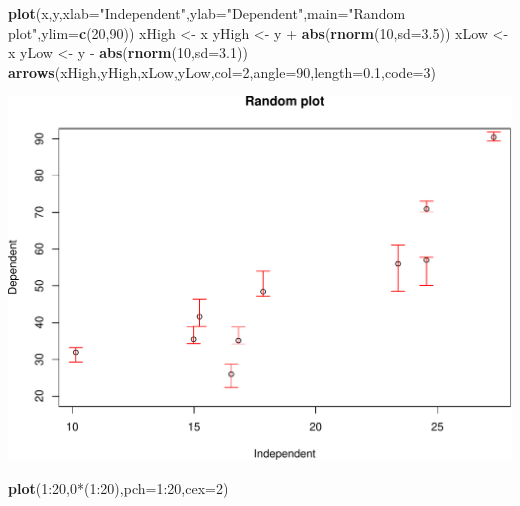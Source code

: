 \documentclass[]{article}
\newenvironment{Shaded}{\begin{snugshade}}{\end{snugshade}}
\newcommand{\KeywordTok}[1]{\textcolor[rgb]{0.13,0.29,0.53}{\textbf{{#1}}}}
\newcommand{\DataTypeTok}[1]{\textcolor[rgb]{0.13,0.29,0.53}{{#1}}}
\newcommand{\DecValTok}[1]{\textcolor[rgb]{0.00,0.00,0.81}{{#1}}}
\newcommand{\FloatTok}[1]{\textcolor[rgb]{0.00,0.00,0.81}{{#1}}}
\newcommand{\StringTok}[1]{\textcolor[rgb]{0.31,0.60,0.02}{{#1}}}
\newcommand{\NormalTok}[1]{{#1}}
\numberwithin{equation}{section}
\begin{document}
\begin{Shaded}
\begin{Highlighting}[]
\KeywordTok{plot}\NormalTok{(x,y,}\DataTypeTok{xlab=}\StringTok{"Independent"}\NormalTok{,}\DataTypeTok{ylab=}\StringTok{"Dependent"}\NormalTok{,}\DataTypeTok{main=}\StringTok{"Random plot"}\NormalTok{,}\DataTypeTok{ylim=}\KeywordTok{c}\NormalTok{(}\DecValTok{20}\NormalTok{,}\DecValTok{90}\NormalTok{))}
\NormalTok{xHigh <-}\StringTok{ }\NormalTok{x}
\NormalTok{yHigh <-}\StringTok{ }\NormalTok{y +}\StringTok{ }\KeywordTok{abs}\NormalTok{(}\KeywordTok{rnorm}\NormalTok{(}\DecValTok{10}\NormalTok{,}\DataTypeTok{sd=}\FloatTok{3.5}\NormalTok{))}
\NormalTok{xLow <-}\StringTok{ }\NormalTok{x}
\NormalTok{yLow <-}\StringTok{ }\NormalTok{y -}\StringTok{ }\KeywordTok{abs}\NormalTok{(}\KeywordTok{rnorm}\NormalTok{(}\DecValTok{10}\NormalTok{,}\DataTypeTok{sd=}\FloatTok{3.1}\NormalTok{))}
\KeywordTok{arrows}\NormalTok{(xHigh,yHigh,xLow,yLow,}\DataTypeTok{col=}\DecValTok{2}\NormalTok{,}\DataTypeTok{angle=}\DecValTok{90}\NormalTok{,}\DataTypeTok{length=}\FloatTok{0.1}\NormalTok{,}\DataTypeTok{code=}\DecValTok{3}\NormalTok{)}
\end{Highlighting}
\end{Shaded}

\includegraphics{index_files/figure-latex/unnamed-chunk-80-1.pdf}

\begin{Shaded}
\begin{Highlighting}[]
\KeywordTok{plot}\NormalTok{(}\DecValTok{1}\NormalTok{:}\DecValTok{20}\NormalTok{,}\DecValTok{0}\NormalTok{*(}\DecValTok{1}\NormalTok{:}\DecValTok{20}\NormalTok{),}\DataTypeTok{pch=}\DecValTok{1}\NormalTok{:}\DecValTok{20}\NormalTok{,}\DataTypeTok{cex=}\DecValTok{2}\NormalTok{)}
\end{Highlighting}
\end{Shaded}
\end{document}
